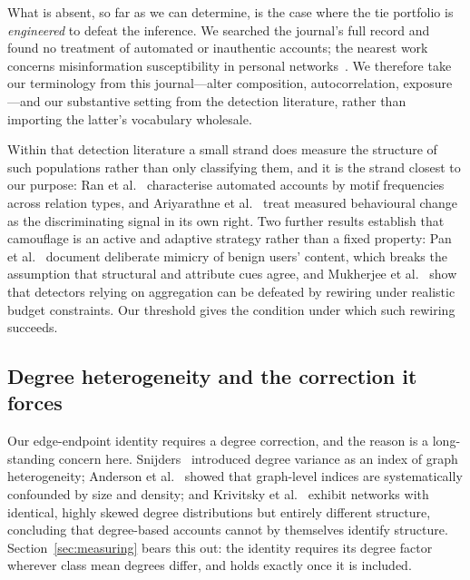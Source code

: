\documentclass[../elsevier.tex]{subfiles}
\begin{document}
What is absent, so far as we can determine, is the case where the tie portfolio is
\emph{engineered} to defeat the inference. We searched the journal's full record and
found no treatment of automated or inauthentic accounts; the nearest work concerns
misinformation susceptibility in personal networks~\citep{choi2026who}. We therefore
take our terminology from this journal---alter composition, autocorrelation,
exposure---and our substantive setting from the detection literature, rather than
importing the latter's vocabulary wholesale.

Within that detection literature a small strand does measure the structure of such
populations rather than only classifying them, and it is the strand closest to our
purpose: Ran et al.~\citeyearpar{ran2025identifying} characterise automated accounts by
motif frequencies across relation types, and Ariyarathne
et al.~\citeyearpar{ariyarathne2026behavior} treat measured behavioural change as the
discriminating signal in its own right. Two further results establish that camouflage is
an active and adaptive strategy rather than a fixed property: Pan et
al.~\citeyearpar{pan2026camera} document deliberate mimicry of benign users' content,
which breaks the assumption that structural and attribute cues agree, and Mukherjee
et al.~\citeyearpar{mukherjee2026optimal} show that detectors relying on aggregation can
be defeated by rewiring under realistic budget constraints. Our threshold gives the
condition under which such rewiring succeeds.

\subsection{Degree heterogeneity and the correction it forces}
\label{sec:related-degree}

Our edge-endpoint identity requires a degree correction, and the reason is a
long-standing concern here. Snijders~\citeyearpar{snijders1981degree} introduced degree
variance as an index of graph heterogeneity; Anderson et al.~\citeyearpar{anderson1999interaction}
showed that graph-level indices are systematically confounded by size and density; and
Krivitsky et al.~\citeyearpar{krivitsky2009representing} exhibit networks with identical,
highly skewed degree distributions but entirely different structure, concluding that
degree-based accounts cannot by themselves identify structure. Section~\ref{sec:measuring}
bears this out: the identity requires its degree factor wherever class mean degrees
differ, and holds exactly once it is included.
\end{document}
